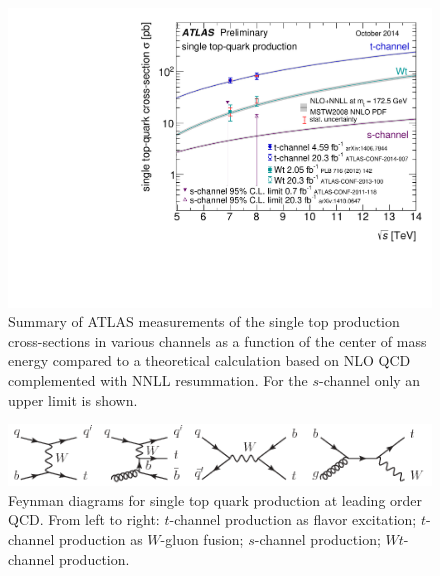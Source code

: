 \begin{figure}
\includegraphics[width=\textwidth]{fig/singletop_allchanvsroots_ATLASonly.pdf}
\caption{Summary of ATLAS measurements of the single top production cross-sections in various channels as a function of the center of mass energy compared to a theoretical calculation based on NLO QCD complemented with NNLL resummation. For the $s$-channel only an upper limit is shown.}
\label{fig:txsec}
\end{figure}

\begin{figure}
\includegraphics[width=\textwidth]{fig/fig_singletop.png}
\caption{Feynman diagrams for single top quark production at leading order QCD. From left to right: $t$-channel production as flavor excitation; $t$-channel production as $W$-gluon fusion; $s$-channel production; $Wt$-channel production.}
\label{fig:tdiag}
\end{figure}
